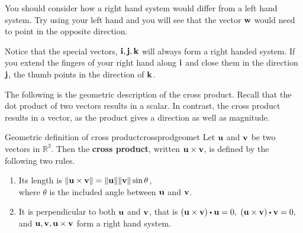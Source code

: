 You should consider how a right hand
system would differ from a left hand system. Try using your left hand and
you will see that the vector ${\bf w}$ would need to point in the
opposite direction.

Notice that the special vectors, ${\bf i},{\bf j},{\bf k}$ will always form a right handed
system. If you extend the fingers of your right hand along ${\bf i}$ and 
close them in the direction ${\bf j}$, the thumb points
in the direction of ${\bf k}$.

\begin{center}
\end{center}

The following is the geometric description of the cross product. Recall that the dot product of 
two vectors results in a scalar. In contrast, the cross product results in a vector, as the product gives
a direction as well as magnitude.

\begin{definition}{Geometric definition of cross product}{crossprodgeomet}
Let ${\bf u}$ and ${\bf v}$ be two vectors in $\mathbb{R}^{3}.$ 
Then the \textbf{cross product}, written ${\bf u}\times {\bf v}$, is defined by
 the following two rules.

\begin{enumerate}
\item Its length is $\| {\bf u}\times {\bf v}\| =\| {\bf u}\| \|
{\bf v}\| \sin \theta $, \\
where $\theta $ is the included angle between ${\bf u}$ and ${\bf v}$.

\item It is perpendicular to both ${\bf u}$ and ${\bf v}$, that is $\left( \vect{u}\times \vect{v} \right) \dotprod \vect{u}=0,$ $\left( \vect{u}\times \vect{v} \right) \dotprod \vect{v}=0,$ \\
and  ${\bf u},{\bf v},{\bf u}\times {\bf v}$ form a right hand system.
\end{enumerate}
\end{definition}

